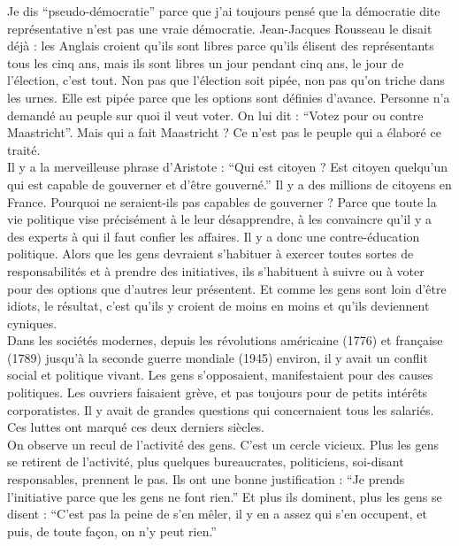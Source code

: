 Je dis ``pseudo-démocratie'' parce que j’ai toujours pensé que la démocratie dite représentative n’est pas une vraie démocratie. Jean-Jacques Rousseau le disait déjà : les Anglais croient qu’ils sont libres parce qu’ils élisent des représentants tous les cinq ans, mais ils sont libres un jour pendant cinq ans, le jour de l’élection, c’est tout. Non pas que l’élection soit pipée, non pas qu’on triche dans les urnes. Elle est pipée parce que les options sont définies d’avance. Personne n’a demandé au peuple sur quoi il veut voter. On lui dit : ``Votez pour ou contre Maastricht''. Mais qui a fait Maastricht ? Ce n’est pas le peuple qui a élaboré ce traité.\\
Il y a la merveilleuse phrase d’Aristote : ``Qui est citoyen ? Est citoyen quelqu’un qui est capable de gouverner et d’être gouverné.'' Il y a des millions de citoyens en France. Pourquoi ne seraient-ils pas capables de gouverner ? Parce que toute la vie politique vise précisément à le leur désapprendre, à les convaincre qu’il y a des experts à qui il faut confier les affaires. Il y a donc une contre-éducation politique. Alors que les gens devraient s’habituer à exercer toutes sortes de responsabilités et à prendre des initiatives, ils s’habituent à suivre ou à voter pour des options que d’autres leur présentent. Et comme les gens sont loin d’être idiots, le résultat, c’est qu’ils y croient de moins en moins et qu’ils deviennent cyniques.\\
Dans les sociétés modernes, depuis les révolutions américaine (1776) et française (1789) jusqu’à la seconde guerre mondiale (1945) environ, il y avait un conflit social et politique vivant. Les gens s’opposaient, manifestaient pour des causes politiques. Les ouvriers faisaient grève, et pas toujours pour de petits intérêts corporatistes. Il y avait de grandes questions qui concernaient tous les salariés. Ces luttes ont marqué ces deux derniers siècles.\\
On observe un recul de l’activité des gens. C’est un cercle vicieux. Plus les gens se retirent de l’activité, plus quelques bureaucrates, politiciens, soi-disant responsables, prennent le pas. Ils ont une bonne justification : ``Je prends l’initiative parce que les gens ne font rien.'' Et plus ils dominent, plus les gens se disent : ``C’est pas la peine de s’en mêler, il y en a assez qui s’en occupent, et puis, de toute façon, on n’y peut rien.''\\
